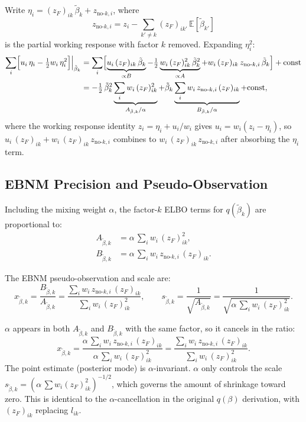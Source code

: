 \documentclass[11pt]{article}
\newcommand{\E}{\mathbb{E}}
\begin{document}
Write $\eta_i = (z_F)_{ik}\,\tilde\beta_k + z_{\text{no-}k,i}$, where
\[
  z_{\text{no-}k,i} = z_i - \sum_{k'\ne k}(z_F)_{ik'}\,\E[\tilde\beta_{k'}]
\]
is the partial working response with factor $k$ removed. Expanding $\eta_i^2$:
\begin{align}
  \sum_i \Bigl[u_i\,\eta_i - \tfrac{1}{2}w_i\,\eta_i^2\Bigr] \Big|_{\tilde\beta_k}
  &= \sum_i \Bigl[
     \underbrace{u_i\,(z_F)_{ik}\,\tilde\beta_k}_{\propto B}
     - \tfrac{1}{2}\underbrace{w_i\,(z_F)_{ik}^2\,\tilde\beta_k^2}_{\propto A}
     + w_i\,(z_F)_{ik}\,z_{\text{no-}k,i}\,\tilde\beta_k
     \Bigr] + \text{const}\nonumber\\
  &= -\tfrac{1}{2}\,\tilde\beta_k^2 \underbrace{\sum_i w_i\,(z_F)_{ik}^2}_{A_{\tilde\beta,k}/\alpha}
     + \tilde\beta_k \underbrace{\sum_i w_i\,z_{\text{no-}k,i}\,(z_F)_{ik}}_{B_{\tilde\beta,k}/\alpha}
     + \text{const},
     \label{eq:beta-quad}
\end{align}
where the working response identity $z_i = \eta_i + u_i/w_i$ gives
$u_i = w_i(z_i - \eta_i)$, so $u_i\,(z_F)_{ik} + w_i\,(z_F)_{ik}\,z_{\text{no-}k,i}$
combines to $w_i\,(z_F)_{ik}\,z_{\text{no-}k,i}$ after absorbing the $\eta_i$ term.

\subsection{EBNM Precision and Pseudo-Observation}

Including the mixing weight $\alpha$, the factor-$k$ ELBO terms for $q(\tilde\beta_k)$ are
proportional to:
\begin{align}
  A_{\tilde\beta,k} &= \alpha\,\sum_i w_i\,(z_F)_{ik}^2, \label{eq:Abeta}\\
  B_{\tilde\beta,k} &= \alpha\,\sum_i w_i\,z_{\text{no-}k,i}\,(z_F)_{ik}. \label{eq:Bbeta}
\end{align}

The EBNM pseudo-observation and scale are:
\begin{equation}
  x_{\tilde\beta,k} = \frac{B_{\tilde\beta,k}}{A_{\tilde\beta,k}}
  = \frac{\sum_i w_i\,z_{\text{no-}k,i}\,(z_F)_{ik}}{\sum_i w_i\,(z_F)_{ik}^2},
  \qquad
  s_{\tilde\beta,k} = \frac{1}{\sqrt{A_{\tilde\beta,k}}} = \frac{1}{\sqrt{\alpha\,\sum_i w_i\,(z_F)_{ik}^2}}.
  \label{eq:x-s-beta}
\end{equation}

\begin{verifybox}
$\alpha$ appears in both $A_{\tilde\beta,k}$ and $B_{\tilde\beta,k}$ with the same factor,
so it cancels in the ratio:
\[
  x_{\tilde\beta,k} = \frac{\alpha\,\sum_i w_i\,z_{\text{no-}k,i}\,(z_F)_{ik}}
                           {\alpha\,\sum_i w_i\,(z_F)_{ik}^2}
  = \frac{\sum_i w_i\,z_{\text{no-}k,i}\,(z_F)_{ik}}{\sum_i w_i\,(z_F)_{ik}^2}.
\]
The point estimate (posterior mode) is $\alpha$-invariant.
$\alpha$ only controls the scale $s_{\tilde\beta,k} = (\alpha\,\sum w_i(z_F)_{ik}^2)^{-1/2}$,
which governs the amount of shrinkage toward zero.
This is identical to the $\alpha$-cancellation in the original $q(\beta)$ derivation,
with $(z_F)_{ik}$ replacing $l_{ik}$.
\end{verifybox}
\end{document}
